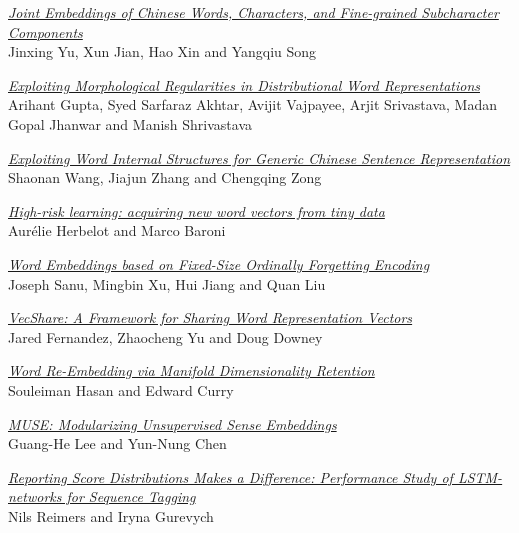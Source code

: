 \hyperlink{page.286}{\em Joint Embeddings of Chinese Words, Characters, and Fine-grained Subcharacter Components}\samepage \\
\hspace*{7mm} Jinxing Yu, Xun Jian, Hao Xin and Yangqiu Song\dotfill {}

\hyperlink{page.292}{\em Exploiting Morphological Regularities in Distributional Word Representations}\samepage \\
\hspace*{7mm} Arihant Gupta, Syed Sarfaraz Akhtar, Avijit Vajpayee, Arjit Srivastava, Madan Gopal Jhanwar and Manish Shrivastava\dotfill {}

\hyperlink{page.298}{\em Exploiting Word Internal Structures for Generic Chinese Sentence Representation}\samepage \\
\hspace*{7mm} Shaonan Wang, Jiajun Zhang and Chengqing Zong\dotfill {}

\hyperlink{page.304}{\em High-risk learning: acquiring new word vectors from tiny data}\samepage \\
\hspace*{7mm} Aur\'{e}lie Herbelot and Marco Baroni\dotfill {}

\hyperlink{page.310}{\em Word Embeddings based on Fixed-Size Ordinally Forgetting Encoding}\samepage \\
\hspace*{7mm} Joseph Sanu, Mingbin Xu, Hui Jiang and Quan Liu\dotfill {}

\hyperlink{page.316}{\em VecShare: A Framework for Sharing Word Representation Vectors}\samepage \\
\hspace*{7mm} Jared Fernandez, Zhaocheng Yu and Doug Downey\dotfill {}

\hyperlink{page.321}{\em Word Re-Embedding via Manifold Dimensionality Retention}\samepage \\
\hspace*{7mm} Souleiman Hasan and Edward Curry\dotfill {}

\hyperlink{page.327}{\em MUSE: Modularizing Unsupervised Sense Embeddings}\samepage \\
\hspace*{7mm} Guang-He Lee and Yun-Nung Chen\dotfill {}

\hyperlink{page.338}{\em Reporting Score Distributions Makes a Difference: Performance Study of LSTM-networks for Sequence Tagging}\samepage \\
\hspace*{7mm} Nils Reimers and Iryna Gurevych\dotfill {}

